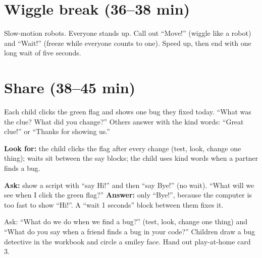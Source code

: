 \section{Wiggle break (36--38 min)}
Slow-motion robots. Everyone stands up. Call out \enquote{Move!} (wiggle like a robot) and \enquote{Wait!} (freeze while everyone counts to one). Speed up, then end with one long wait of five seconds.

\section{Share (38--45 min)}
\begin{teacherscript}
Each child clicks the green flag and shows one bug they fixed today. \enquote{What was the clue? What did you change?} Others answer with the kind words: \enquote{Great clue!} or \enquote{Thanks for showing us.}
\end{teacherscript}

\begin{formativecheck}
\textbf{Look for:} the child clicks the flag after every change (test, look, change one thing); waits sit between the say blocks; the child uses kind words when a partner finds a bug.

\textbf{Ask:} show a script with \enquote{say Hi!} and then \enquote{say Bye!} (no wait). \enquote{What will we see when I click the green flag?}
\textbf{Answer:} only \enquote{Bye!}, because the computer is too fast to show \enquote{Hi!}. A \enquote{wait 1 seconds} block between them fixes it.
\end{formativecheck}

\begin{reflection}
Ask: \enquote{What do we do when we find a bug?} (test, look, change one thing) and \enquote{What do you say when a friend finds a bug in your code?} Children draw a bug detective in the workbook and circle a smiley face. Hand out play-at-home card 3.
\end{reflection}

